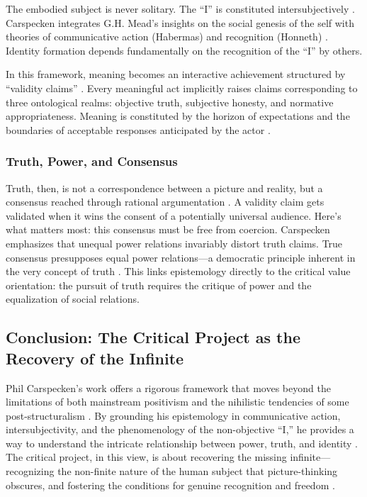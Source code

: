 \documentclass[12pt]{book}
\begin{document}
The embodied subject is never solitary. The ``I'' is constituted intersubjectively \parencite{Carspecken2013aa}. Carspecken integrates G.H. Mead's insights on the social genesis of the self with theories of communicative action (Habermas) and recognition (Honneth) \parencite{Carspecken1995aa, Carspecken1999, Carspecken2018}. Identity formation depends fundamentally on the recognition of the ``I'' by others.

In this framework, meaning becomes an interactive achievement structured by ``validity claims'' \parencite{Carspecken1995aa}. Every meaningful act implicitly raises claims corresponding to three ontological realms: objective truth, subjective honesty, and normative appropriateness. Meaning is constituted by the horizon of expectations and the boundaries of acceptable responses anticipated by the actor \parencite{Carspecken1999, Carspecken2013aa}.

\subsubsection{Truth, Power, and Consensus}\label{truth-power-and-consensus}

Truth, then, is not a correspondence between a picture and reality, but a consensus reached through rational argumentation \parencite{Carspecken1995aa}. A validity claim gets validated when it wins the consent of a potentially universal audience. Here's what matters most: this consensus must be free from coercion. Carspecken emphasizes that unequal power relations invariably distort truth claims. True consensus presupposes equal power relations—a democratic principle inherent in the very concept of truth \parencite{Carspecken1995aa}. This links epistemology directly to the critical value orientation: the pursuit of truth requires the critique of power and the equalization of social relations.

\subsection{Conclusion: The Critical Project as the Recovery of the Infinite}\label{conclusion-the-critical-project-as-the-recovery-of-the-infinite}

Phil Carspecken's work offers a rigorous framework that moves beyond the limitations of both mainstream positivism and the nihilistic tendencies of some post-structuralism \parencite{Carspecken1995aa}. By grounding his epistemology in communicative action, intersubjectivity, and the phenomenology of the non-objective ``I,'' he provides a way to understand the intricate relationship between power, truth, and identity \parencite{Carspecken1999, Carspecken2013aa}. The critical project, in this view, is about recovering the missing infinite—recognizing the non-finite nature of the human subject that picture-thinking obscures, and fostering the conditions for genuine recognition and freedom \parencite{Carspecken1999, Carspecken2018}.

\printbibliography
\end{document}
